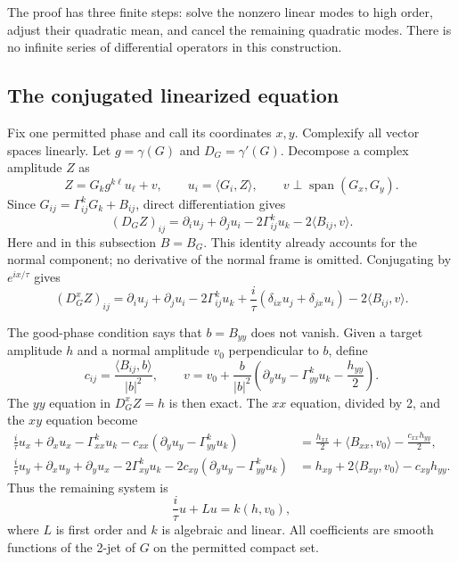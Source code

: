 The proof has three finite steps: solve the nonzero linear modes to high order,
adjust their quadratic mean, and cancel the remaining quadratic modes.
There is no infinite series of differential operators in this construction.

\subsection{The conjugated linearized equation}

Fix one permitted phase and call its coordinates $x,y$. Complexify all vector
spaces linearly. Let $g=\gamma(G)$ and $D_G=\gamma'(G)$. Decompose a complex
amplitude $Z$ as
\[
 Z=G_k g^{k\ell}u_\ell+v,
 \qquad u_i=\langle G_i,Z\rangle,
 \qquad v\perp\operatorname{span}(G_x,G_y).
\]
Since $G_{ij}=\Gamma^k_{ij}G_k+B_{ij}$, direct differentiation gives
\[
 (D_GZ)_{ij}
 =\partial_i u_j+\partial_j u_i-2\Gamma^k_{ij}u_k
       -2\langle B_{ij},v\rangle.
\]
Here and in this subsection $B=B_G$. This identity already accounts for the
normal component; no derivative of the normal frame is omitted. Conjugating by
$e^{ix/\tau}$ gives
\begin{equation}\label{eq:conjugated-metric-linearization}
 (D_G^xZ)_{ij}
 =\partial_i u_j+\partial_j u_i-2\Gamma^k_{ij}u_k
 +\frac{i}{\tau}(\delta_{ix}u_j+\delta_{jx}u_i)
 -2\langle B_{ij},v\rangle.
\end{equation}

The good-phase condition says that $b=B_{yy}$ does not vanish. Given a target
amplitude $h$ and a normal amplitude $v_0$ perpendicular to $b$, define
\begin{equation}\label{eq:normal-elimination}
 c_{ij}=\frac{\langle B_{ij},b\rangle}{|b|^2},\qquad
 v=v_0+\frac b{|b|^2}
 \left(\partial_yu_y-\Gamma^k_{yy}u_k-\frac{h_{yy}}2\right).
\end{equation}
The $yy$ equation in $D_G^xZ=h$ is then exact. The $xx$ equation, divided by 2,
and the $xy$ equation become
\begin{align}
 \frac i\tau u_x+\partial_xu_x-\Gamma^k_{xx}u_k
  -c_{xx}(\partial_yu_y-\Gamma^k_{yy}u_k)
 &=\frac{h_{xx}}2+\langle B_{xx},v_0\rangle
                      -\frac{c_{xx}h_{yy}}2,
 \label{eq:conjugated-xx}\\
 \frac i\tau u_y+\partial_xu_y+\partial_yu_x-2\Gamma^k_{xy}u_k
  -2c_{xy}(\partial_yu_y-\Gamma^k_{yy}u_k)
 &=h_{xy}+2\langle B_{xy},v_0\rangle-c_{xy}h_{yy}.
 \label{eq:conjugated-xy}
\end{align}
Thus the remaining system is
\[
 \frac i\tau u+Lu=k(h,v_0),
\]
where $L$ is first order and $k$ is algebraic and linear. All coefficients are
smooth functions of the 2-jet of $G$ on the permitted compact set.


